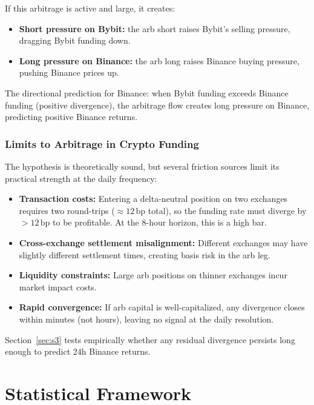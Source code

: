 \documentclass[12pt, a4paper]{article}
\theoremstyle{plain}
\theoremstyle{definition}
\newcommand{\bp}{\,\mathrm{bp}}
\begin{document}
If this arbitrage is active and large, it creates:
\begin{itemize}[noitemsep]
  \item \textbf{Short pressure on Bybit:} the arb short raises
        Bybit's selling pressure, dragging Bybit funding down.
  \item \textbf{Long pressure on Binance:} the arb long raises
        Binance buying pressure, pushing Binance prices up.
\end{itemize}

The directional prediction for Binance: when Bybit funding exceeds
Binance funding (positive divergence), the arbitrage flow creates
long pressure on Binance, predicting positive Binance returns.

\subsubsection{Limits to Arbitrage in Crypto Funding}

The hypothesis is theoretically sound, but several friction sources
limit its practical strength at the daily frequency:

\begin{itemize}
  \item \textbf{Transaction costs:}  Entering a delta-neutral position
        on two exchanges requires two round-trips ($\approx 12\bp$ total),
        so the funding rate must diverge by $> 12\bp$ to be profitable.
        At the 8-hour horizon, this is a high bar.
  \item \textbf{Cross-exchange settlement misalignment:}  Different
        exchanges may have slightly different settlement times, creating
        basis risk in the arb leg.
  \item \textbf{Liquidity constraints:}  Large arb positions on thinner
        exchanges incur market impact costs.
  \item \textbf{Rapid convergence:}  If arb capital is well-capitalized,
        any divergence closes within minutes (not hours), leaving no
        signal at the daily resolution.
\end{itemize}

Section~\ref{sec:s3} tests empirically whether any residual divergence
persists long enough to predict 24h Binance returns.

\section{Statistical Framework}
\label{sec:stats}
\end{document}
